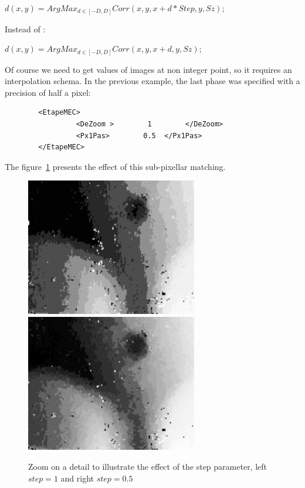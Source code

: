      $d(x,y) = ArgMax_{d\in[-D,D]} Corr(x,y,x+d*Step,y,Sz)$;

Instead of :

     $d(x,y) = ArgMax_{d\in[-D,D]} Corr(x,y,x+d,y,Sz)$;

Of course we need to get values of images at non integer point, so
it requires an interpolation schema. In the previous example, the last phase 
was specified with a precision of half a pixel:


{\scriptsize
\begin{verbatim}
        <EtapeMEC>
                 <DeZoom >        1        </DeZoom>
                 <Px1Pas>        0.5  </Px1Pas>
        </EtapeMEC>
\end{verbatim}
}


The figure~\ref{FIG:DISP:PB:DISC} presents the effect
of this sub-pixellar matching.

\begin{figure}
\begin{center}
\includegraphics[height=60mm]{FIGS/Boudhas/Px1-Num4-PbDisc.jpg}
\includegraphics[height=60mm]{FIGS/Boudhas/Px1-Num5-PbDisc.jpg}
\caption{Zoom on a detail to illustrate the effect of the step parameter, left $step=1$ and right $step=0.5$}
\label{FIG:DISP:PB:DISC}
\end{center}
\end{figure}

